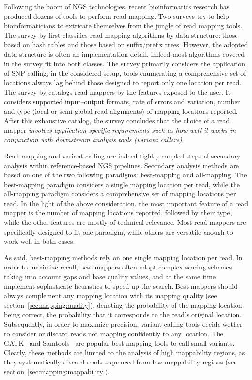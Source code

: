 Following the boom of NGS technologies, recent bioinformatics research has produced dozens of tools to perform read mapping.
Two surveys \citep{Li2010, Fonseca2012} try to help bioinformaticians to extricate themselves from the jungle of read mapping tools.
The survey by \citeauthor{Li2010} first classifies read mapping algorithms by data structure: those based on hash tables and those based on suffix/prefix trees.
However, the adopted data structure is often an implementation detail, indeed most algorithms covered in the survey fit into both classes.
The survey primarily considers the application of SNP calling; in the considered setup, tools enumerating a comprehensive set of locations always lag behind those designed to report only one location per read.
The survey by \citeauthor{Fonseca2012} catalogs read mappers by the features exposed to the user.
It considers supported input--output formats, rate of errors and variation, number and type (\ie local or semi-global read alignments) of mapping locations reported.
After this exhaustive catalog, the survey concludes that the choice of a read mapper 
\emph{involves application-specific requirements such as how well it works in conjunction with downstream analysis tools (\ie variant callers)}.

Read mapping and variant calling are indeed tightly coupled steps of secondary analysis within reference-based NGS pipelines.
Secondary analysis methods are based on one of the two following paradigms: best-mapping and all-mapping.
The best-mapping paradigm considers a single mapping location per read, while the all-mapping paradigm considers a comprehensive set of mapping locations per read.
In the light of the above consideration, the most important feature of a read mapper is the number of mapping locations reported, followed by their type, while the other features are mostly of technical relevance.
Most read mappers are specifically designed to fit one paradigm, while others are versatile enough to work well in both cases.

As said, best-mapping methods rely on one single mapping location per read.
In order to maximize recall, best-mappers often adopt complex scoring schemes taking into account gaps and base quality values, and at the same time implement sophisticate heuristics to speed up the search.
Best-mappers should always complement any mapping location with its mapping quality (see section~\ref{sec:mapping:quality}), denoting the probability of the mapping location being correct, \ie the probability that it corresponds to the read's original location.
Subsequently, in order to maximize precision, variant calling tools decide wether to consider or discard reads not mapping confidently to any location.
The GATK~\citep{gatk} and Samtools~\citep{samtools} are popular best-mapping tools to call small variants.
Clearly, these methods are limited to the analysis of high mappability regions, as they systematically discard reads sequenced from low mappability regions (see section~\ref{sec:mapping:mappability}).

